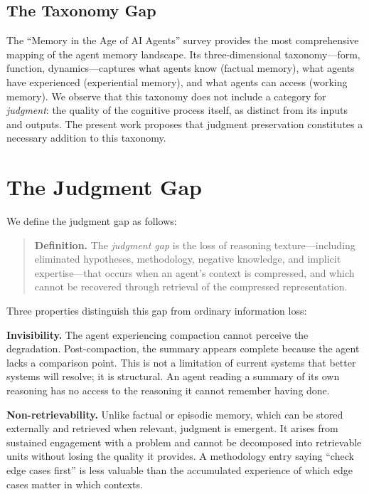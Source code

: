 \documentclass[11pt,a4paper]{article}
\begin{document}
\subsection{The Taxonomy Gap}

The ``Memory in the Age of AI Agents'' survey \citep{memory_survey_2025}
provides the most comprehensive mapping of the agent memory landscape.
Its three-dimensional taxonomy---form, function, dynamics---captures
what agents know (factual memory), what agents have experienced
(experiential memory), and what agents can access (working memory).
We observe that this taxonomy does not include a category for
\emph{judgment}: the quality of the cognitive process itself, as
distinct from its inputs and outputs. The present work proposes that
judgment preservation constitutes a necessary addition to this
taxonomy.


\section{The Judgment Gap}
\label{sec:gap}

We define the judgment gap as follows:

\begin{quote}
\textbf{Definition.} The \emph{judgment gap} is the loss of reasoning
texture---including eliminated hypotheses, methodology, negative
knowledge, and implicit expertise---that occurs when an agent's context
is compressed, and which cannot be recovered through retrieval of the
compressed representation.
\end{quote}

Three properties distinguish this gap from ordinary information loss:

\textbf{Invisibility.} The agent experiencing compaction cannot
perceive the degradation. Post-compaction, the summary appears complete
because the agent lacks a comparison point. This is not a limitation
of current systems that better systems will resolve; it is structural.
An agent reading a summary of its own reasoning has no access to the
reasoning it cannot remember having done.

\textbf{Non-retrievability.} Unlike factual or episodic memory, which
can be stored externally and retrieved when relevant, judgment is
emergent. It arises from sustained engagement with a problem and cannot
be decomposed into retrievable units without losing the quality it
provides. A methodology entry saying ``check edge cases first'' is
less valuable than the accumulated experience of which edge cases
matter in which contexts.
\end{document}
